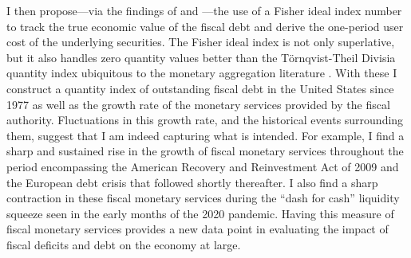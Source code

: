 \documentclass[11pt,a4paper,margin=1.5in]{article}
\begin{document}
I then propose---via the findings of \citet{Diewert:1976,Diewert:1978} and \citet{Dumagan:2002}---the use of a Fisher ideal index number to track the true economic value of the fiscal debt and derive the one-period user cost of the underlying securities.
The Fisher ideal index is not only superlative, but it also handles zero quantity values better than the T\"{o}rnqvist-Theil Divisia quantity index ubiquitous to the monetary aggregation literature \citep[e.g.][]{Barnett-Serletis:2000}.
With these I construct a quantity index of outstanding fiscal debt in the United States since 1977 as well as the growth rate of the monetary services provided by the fiscal authority. 
Fluctuations in this growth rate, and the historical events surrounding them, suggest that I am indeed capturing what is intended.
For example, I find a sharp and sustained rise in the growth of fiscal monetary services throughout the period encompassing the American Recovery and Reinvestment Act of 2009 and the European debt crisis that followed shortly thereafter.
I also find a sharp contraction in these fiscal monetary services during the ``dash for cash'' liquidity squeeze seen in the early months of the 2020 pandemic. 
Having this measure of fiscal monetary services provides a new data point in evaluating the impact of fiscal deficits and debt on the economy at large. 

\end{document}
